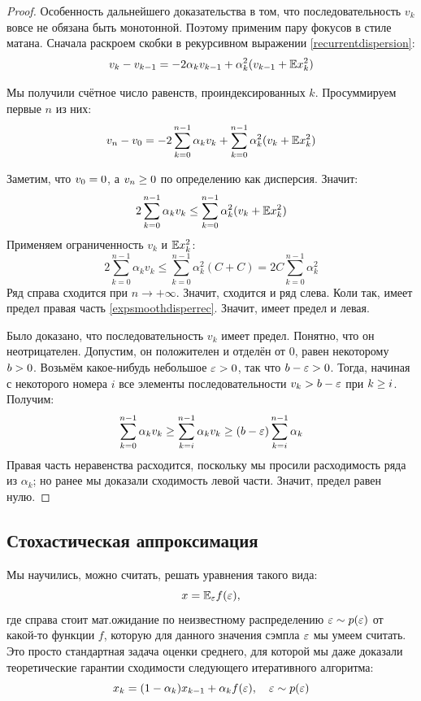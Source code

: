 \begin{theoremBox}[label=th:expsmoothingconvergence]{}
\begin{proof}
Особенность дальнейшего доказательства в том, что последовательность $v_k$ вовсе не обязана быть монотонной. Поэтому применим пару фокусов в стиле матана. Сначала раскроем скобки в рекурсивном выражении \eqref{recurrentdispersion}:
$$v_{k} - v_{k-1} = - 2\alpha_k v_{k-1} + \alpha_k^2 (v_{k-1} + \mathbb{E} x_k^2)$$

Мы получили счётное число равенств, проиндексированных $k$. Просуммируем первые $n$ из них:
\begin{equation}\label{expsmoothdisperrec}
v_{n} - v_0 = - 2 \sum_{k = 0}^{n-1} \alpha_k v_k + \sum_{k = 0}^{n-1} \alpha_k^2 (v_k + \mathbb{E} x_k^2)
\end{equation}

Заметим, что $v_0 \HM= 0$, а $v_{n} \HM\ge 0$ по определению как дисперсия. Значит: 
$$2 \sum_{k = 0}^{n-1} \alpha_k v_k \le \sum_{k = 0}^{n-1} \alpha_k^2 (v_k + \mathbb{E} x_k^2)$$
Применяем ограниченность $v_k$ и $\mathbb{E} x_k^2$:
$$2 \sum_{k = 0}^{n-1} \alpha_k v_k \le \sum_{k = 0}^{n-1} \alpha_k^2 (C + C) = 2C \sum_{k = 0}^{n-1} \alpha_k^2$$
Ряд справа сходится при $n \to +\infty$. Значит, сходится и ряд слева. Коли так, имеет предел правая часть \eqref{expsmoothdisperrec}. Значит, имеет предел и левая.

Было доказано, что последовательность $v_k$ имеет предел. Понятно, что он неотрицателен. Допустим, он положителен и отделён от 0, равен некоторому $b \HM> 0$. Возьмём какое-нибудь небольшое $\eps \HM> 0$, так что $b \HM- \eps \HM> 0$. Тогда, начиная с некоторого номера $i$ все элементы последовательности $v_k \HM> b \HM- \eps$ при $k \HM\ge i$. Получим:
$$\sum_{k = 0}^{n-1} \alpha_k v_k \ge \sum_{k = i}^{n-1} \alpha_k v_k \ge (b - \varepsilon) \sum_{k = i}^{n-1} \alpha_k$$
Правая часть неравенства расходится, поскольку мы просили расходимость ряда из $\alpha_k$; но ранее мы доказали сходимость левой части. Значит, предел равен нулю.
\end{proof}
\end{theoremBox}


\subsection{Стохастическая аппроксимация}

Мы научились, можно считать, решать уравнения такого вида:
$$x = \mathbb{E}_{\varepsilon} f(\varepsilon),$$
где справа стоит мат.ожидание по неизвестному распределению $\varepsilon \sim p(\varepsilon)$ от какой-то функции $f$, которую для данного значения сэмпла $\varepsilon$ мы умеем считать. Это просто стандартная задача оценки среднего, для которой мы даже доказали теоретические гарантии сходимости следующего итеративного алгоритма:
$$x_k = (1 - \alpha_k)x_{k-1} + \alpha_k f(\varepsilon), \quad \varepsilon \sim p(\varepsilon)$$

